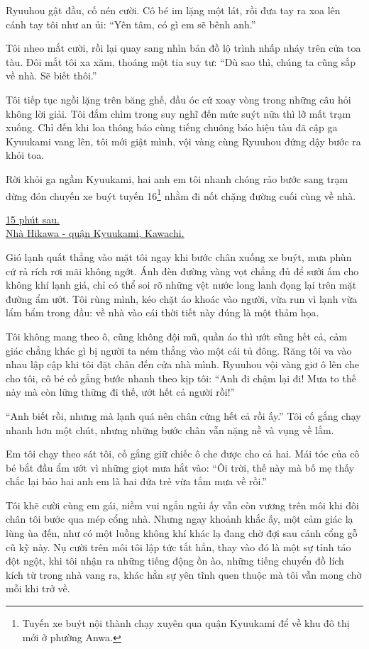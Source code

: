 \documentclass[../main.tex]{subfiles}
\begin{document}
Ryuuhou gật đầu, cố nén cười. Cô bé im lặng một lát, rồi đưa tay ra xoa lên cánh tay tôi như an ủi: ``Yên tâm, có gì em sẽ bênh anh.''

Tôi nheo mắt cười, rồi lại quay sang nhìn bản đồ lộ trình nhấp nháy trên cửa toa tàu. Đôi mắt tôi xa xăm, thoáng một tia suy tư: ``Dù sao thì, chúng ta cũng sắp về nhà. Sẽ biết thôi.''

Tôi tiếp tục ngồi lặng trên băng ghế, đầu óc cứ xoay vòng trong những câu hỏi không lời giải. Tôi đắm chìm trong suy nghĩ đến mức suýt nữa thì lỡ mất trạm xuống. Chỉ đến khi loa thông báo cùng tiếng chuông báo hiệu tàu đã cập ga Kyuukami vang lên, tôi mới giật mình, vội vàng cùng Ryuuhou đứng dậy bước ra khỏi toa.

Rời khỏi ga ngầm Kyuukami, hai anh em tôi nhanh chóng rảo bước sang trạm dừng đón chuyến xe buýt tuyến 16\footnote{Tuyến xe buýt nội thành chạy xuyên qua quận Kyuukami để về khu đô thị mới ở phường Anwa.} nhằm đi nốt chặng đường cuối cùng về nhà.

\begin{center}
  \uline{15 phút sau.\\Nhà Hikawa - quận Kyuukami, Kawachi.}
\end{center}

Gió lạnh quất thẳng vào mặt tôi ngay khi bước chân xuống xe buýt, mưa phùn cứ rả rích rơi mãi không ngớt. Ánh đèn đường vàng vọt chẳng đủ để sưởi ấm cho không khí lạnh giá, chỉ có thể soi rõ những vệt nước long lanh đọng lại trên mặt đường ẩm ướt. Tôi rùng mình, kéo chặt áo khoác vào người, vừa run vì lạnh vừa lẩm bẩm trong đầu: về nhà vào cái thời tiết này đúng là một thảm họa.

Tôi không mang theo ô, cũng không đội mũ, quần áo thì ướt sũng hết cả, cảm giác chẳng khác gì bị người ta ném thẳng vào một cái tủ đông. Răng tôi va vào nhau lập cập khi tôi đặt chân đến cửa nhà mình. Ryuuhou vội vàng giơ ô lên che cho tôi, cô bé cố gắng bước nhanh theo kịp tôi: ``Anh đi chậm lại đi! Mưa to thế này mà còn lững thững đi thế, ướt hết cả người rồi!''

``Anh biết rồi, nhưng mà lạnh quá nên chân cứng hết cả rồi ấy.'' Tôi cố gắng chạy nhanh hơn một chút, nhưng những bước chân vẫn nặng nề và vụng về lắm.

Em tôi chạy theo sát tôi, cố gắng giữ chiếc ô che được cho cả hai. Mái tóc của cô bé bắt đầu ẩm ướt vì những giọt mưa hắt vào: ``Ôi trời, thế này mà bố mẹ thấy chắc lại bảo hai anh em là hai đứa trẻ vừa tắm mưa về rồi.''

Tôi khẽ cười cùng em gái, niềm vui ngắn ngủi ấy vẫn còn vương trên môi khi đôi chân tôi bước qua mép cổng nhà. Nhưng ngay khoảnh khắc ấy, một cảm giác lạ lùng ùa đến, như có một luồng không khí khác lạ đang chờ đợi sau cánh cổng gỗ cũ kỹ này. Nụ cười trên môi tôi lập tức tắt hẳn, thay vào đó là một sự tỉnh táo đột ngột, khi tôi nhận ra những tiếng động ồn ào, những tiếng chuyển đồ lích kích từ trong nhà vang ra, khác hẳn sự yên tĩnh quen thuộc mà tôi vẫn mong chờ mỗi khi trở về.
\end{document}
